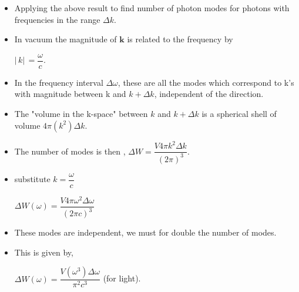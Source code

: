 \documentclass[aspectratio=169]{beamer}
\begin{document}
\begin{frame}
	\begin{itemize}
		\item Applying the above result to find number of photon modes for photons with frequencies in the range $\Delta k$.
		\item In vacuum the magnitude of $\mathbf{k}$ is related to the frequency by \pause \newline
		
		$ \rvert\,k\rvert\, = \dfrac{\omega}{c}$.\pause \newline
		\item In the frequency interval $\Delta \omega$, these are all the modes which correspond to k's with magnitude between k and $k + \Delta k$, independent of the direction.
		\item The "volume in the k-space" between $k$ and $k + \Delta k $ is a spherical shell of volume \pause \newline
		$ 4\pi(k^2)\Delta k$.
	\end{itemize}
\end{frame}

\begin{frame}
	\begin{itemize}
		\item The number of modes is then , \pause \newline
		\center $\Delta W = \dfrac{V4\pi k^2\Delta k}{(2\pi)^3}$.
		\pause \newline
		\item substitute $k = \dfrac{\omega}{c}$\pause \newline
		
		$ \Delta W(\omega) = \dfrac{V4\pi \omega^2 \Delta \omega}{(2\pi c )^3}$
		
	\end{itemize}
\end{frame}

\begin{frame}
	\begin{itemize}
	\item These modes are independent, we must for double the number of modes.
	\item This is given by,\pause \newline
	
	$ \Delta W(\omega) = \dfrac{V(\omega^3)\Delta \omega}{\pi^2 c^3}$  (for light).
	\end{itemize}
\end{frame}
\end{document}

